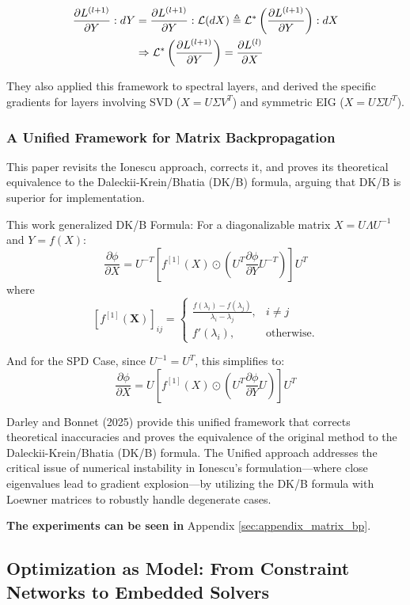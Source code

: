 \documentclass{article}
\begin{document}
\begin{align}
  \frac{\partial L^{(l+1)}}{\partial Y} : dY &= \frac{\partial L^{(l+1)}}{\partial Y} : \mathcal{L}(dX) \triangleq \mathcal{L}^* \left( \frac{\partial L^{(l+1)}}{\partial Y} \right) : dX \notag \\
  &\Rightarrow \mathcal{L}^* \left( \frac{\partial L^{(l+1)}}{\partial Y} \right) = \frac{\partial L^{(l)}}{\partial X}
\end{align}

They also applied this framework to spectral layers, and derived the specific gradients for layers involving SVD ($X = U \Sigma V^T$) and symmetric EIG ($X = U \Sigma U^T$).

\subsubsection{A Unified Framework for Matrix Backpropagation}

This paper \cite{darley2024unified} revisits the Ionescu approach, corrects it, and proves its theoretical equivalence to the Daleckii-Krein/Bhatia (DK/B) formula, arguing that DK/B is superior for implementation.

This work generalized DK/B Formula: For a diagonalizable matrix $X = U \Lambda U^{-1}$ and $Y=f(X)$:$$\frac{\partial\phi}{\partial X} = U^{-T} [f^{[1]}(X) \odot (U^T \frac{\partial\phi}{\partial Y} U^{-T})] U^T$$
where
$$[f^{[1]}(\mathbf{X})]_{ij} =
\begin{cases}
  \frac{f(\lambda_i) - f(\lambda_j)}{\lambda_i - \lambda_j}, & i \neq j \\
  f'(\lambda_i), & \text{otherwise.}
\end{cases}$$

And for the SPD Case, since $U^{-1}=U^T$, this simplifies to:
$$\frac{\partial\phi}{\partial X} = U [f^{[1]}(X) \odot (U^T \frac{\partial\phi}{\partial Y} U)] U^T$$

Darley and Bonnet (2025) provide this unified framework that corrects theoretical inaccuracies and proves the equivalence of the original method to the Daleckii-Krein/Bhatia (DK/B) formula. The Unified approach addresses the critical issue of numerical instability in Ionescu's formulation—where close eigenvalues lead to gradient explosion—by utilizing the DK/B formula with Loewner matrices to robustly handle degenerate cases.

\textbf{The experiments can be seen in }Appendix \ref{sec:appendix_matrix_bp}.

\subsection{Optimization as Model: From Constraint Networks to Embedded Solvers}
\end{document}
